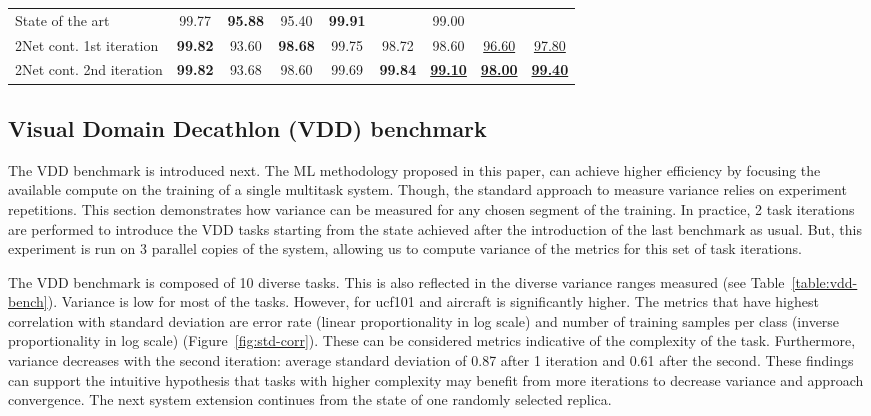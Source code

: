 \documentclass{article} \usepackage{iclr2023_conference,times}
\newcommand{\muNet}{2Net\xspace}
\begin{document}
\begin{table}[t]
\begin{tabular}{lcccccccc}
\\

\midrule
State of the art           & 99.77 & \textbf{95.88} & 95.40 & \textbf{99.91} &  & 99.00 &  &  \\
\muNet cont. 1st iteration & \textbf{99.82} & 93.60 & \textbf{98.68} & 99.75 & 98.72 & 98.60 & \underline{96.60} & \underline{97.80} \\
\muNet cont. 2nd iteration & \textbf{99.82} & 93.68 & 98.60 & 99.69 & \textbf{99.84} & \underline{\textbf{99.10}} & \underline{\textbf{98.00}} & \underline{\textbf{99.40}} \\
    \bottomrule
  \end{tabular}
  \vspace{-10pt}
\end{table}

\subsection{Visual Domain Decathlon (VDD) benchmark}
\label{subsection:vdd}
The VDD benchmark \citep{hakanbilensylvestrerebuffitomasjakab2017} is introduced next.
The ML methodology proposed in this paper, can achieve higher efficiency by focusing the available compute on the training of a single multitask system.
Though, the standard approach to measure variance relies on experiment repetitions.
This section demonstrates how variance can be measured for any chosen segment of the training.
In practice, 2 task iterations are performed to introduce the VDD tasks starting from the state achieved after the introduction of the last benchmark as usual.
But, this experiment is run on 3 parallel copies of the system, allowing us to compute variance of the metrics for this set of task iterations.

The VDD benchmark is composed of 10 diverse tasks.
This is also reflected in
the diverse variance ranges measured 
(see Table~\ref{table:vdd-bench}).
Variance is low for most of the tasks.
However, for ucf101 and aircraft is significantly higher.
The metrics that have highest correlation with standard deviation are error rate (linear proportionality in log scale) and number of training samples per class (inverse proportionality in log scale) (Figure~\ref{fig:std-corr}).
These can be considered metrics indicative of the complexity of the task.
Furthermore, variance decreases with the second iteration: average standard deviation of 0.87 after 1 iteration and 0.61 after the second.
These findings can support the intuitive hypothesis that tasks with higher complexity may benefit from more iterations to decrease variance and approach convergence.
The next system extension continues from the state of one randomly selected replica.
\end{document}
